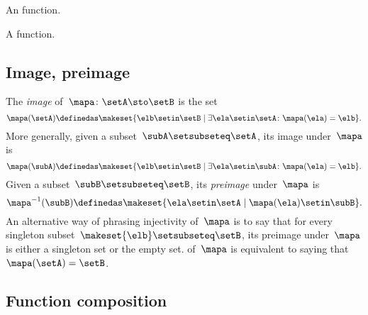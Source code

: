 \begin{marginfigure}
    \centering
    \caption{An  function.}
    \label{fig:inj-function}
\end{marginfigure}

\begin{marginfigure}
    \centering
    \caption{A  function.}
    \label{fig:surj-function}
\end{marginfigure}

\subsection{Image, preimage}

The \emph{image} of~$\mapa\colon \setA \sto \setB$ is the set
\begin{equation}
    \mapa(\setA) \definedas \makeset{ \elb \setin\setB \mid \exists \ela \setin\setA \colon \mapa(\ela) = \elb }.
\end{equation}
More generally, given a subset~$\subA \setsubseteq \setA$, its image under~$\mapa$ is
\begin{equation}
    \mapa(\subA) \definedas \makeset{ \elb \setin\setB \mid \exists \ela \setin\subA \colon \mapa(\ela) = \elb }.
\end{equation}
Given a subset~$\subB \setsubseteq \setB$, its \emph{preimage} under~$\mapa$ is
\begin{equation}
    \mapa^{-1}(\subB) \definedas \makeset{ \ela \setin\setA \mid \mapa(\ela) \setin\subB }.
\end{equation}
An alternative way of phrasing injectivity of~$\mapa$ is to say that for every singleton subset~$\makeset{ \elb } \setsubseteq \setB$, its preimage under~$\mapa$ is either a singleton set or the empty set.
 of~$\mapa$ is equivalent to saying that~$\mapa(\setA) = \setB$.

\subsection{Function composition}

\begin{marginfigure}
    \centering
    \caption{}
    \label{fig:function_comp_figure}
\end{marginfigure}

\begin{marginfigure}
    \centering
    \caption{}
    \label{fig:function_comp_figure_b}
\end{marginfigure}

